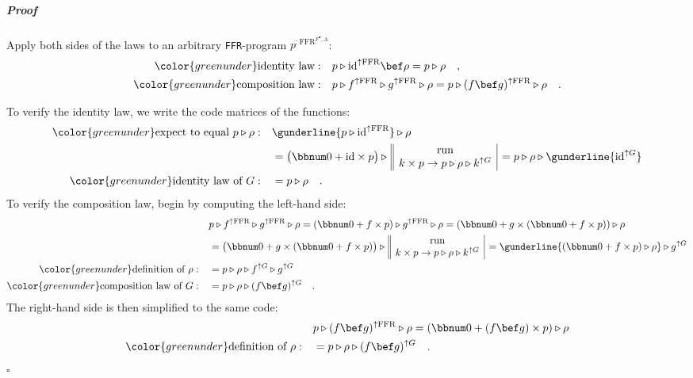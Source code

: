\subparagraph{Proof}

Apply both sides of the laws to an arbitrary \lstinline!FFR!-program
$p^{:\text{FFR}^{F^{\bullet},A}}$:
\begin{align*}
{\color{greenunder}\text{identity law}:}\quad & p\triangleright\text{id}^{\uparrow\text{FFR}}\bef\rho=p\triangleright\rho\quad,\\
{\color{greenunder}\text{composition law}:}\quad & p\triangleright f^{\uparrow\text{FFR}}\triangleright g^{\uparrow\text{FFR}}\triangleright\rho=p\triangleright(f\bef g)^{\uparrow\text{FFR}}\triangleright\rho\quad.
\end{align*}

To verify the identity law, we write the code matrices of the functions:
\begin{align*}
{\color{greenunder}\text{expect to equal }p\triangleright\rho:}\quad & \gunderline{p\triangleright\text{id}^{\uparrow\text{FFR}}}\triangleright\rho\\
 & =\big(\bbnum 0+\text{id}\times p\big)\triangleright\,\begin{array}{||c|}
\text{run}\\
k\times p\rightarrow p\triangleright\rho\triangleright k^{\uparrow G}
\end{array}\,=p\triangleright\rho\triangleright\gunderline{\text{id}^{\uparrow G}}\\
{\color{greenunder}\text{identity law of }G:}\quad & =p\triangleright\rho\quad.
\end{align*}
To verify the composition law, begin by computing the left-hand side:
\begin{align*}
 & p\triangleright f^{\uparrow\text{FFR}}\triangleright g^{\uparrow\text{FFR}}\triangleright\rho=(\bbnum 0+f\times p)\triangleright g^{\uparrow\text{FFR}}\triangleright\rho=(\bbnum 0+g\times(\bbnum 0+f\times p))\triangleright\rho\\
 & =\big(\bbnum 0+g\times(\bbnum 0+f\times p)\big)\triangleright\,\begin{array}{||c|}
\text{run}\\
k\times p\rightarrow p\triangleright\rho\triangleright k^{\uparrow G}
\end{array}\,=\gunderline{(\bbnum 0+f\times p)\triangleright\rho}\triangleright g^{\uparrow G}\\
{\color{greenunder}\text{definition of }\rho:}\quad & =p\triangleright\rho\triangleright f^{\uparrow G}\triangleright g^{\uparrow G}\\
{\color{greenunder}\text{composition law of }G:}\quad & =p\triangleright\rho\triangleright(f\bef g)^{\uparrow G}\quad.
\end{align*}
The right-hand side is then simplified to the same code:
\begin{align*}
 & p\triangleright(f\bef g)^{\uparrow\text{FFR}}\triangleright\rho=(\bbnum 0+(f\bef g)\times p)\triangleright\rho\\
{\color{greenunder}\text{definition of }\rho:}\quad & =p\triangleright\rho\triangleright(f\bef g)^{\uparrow G}\quad.
\end{align*}
$\square$

